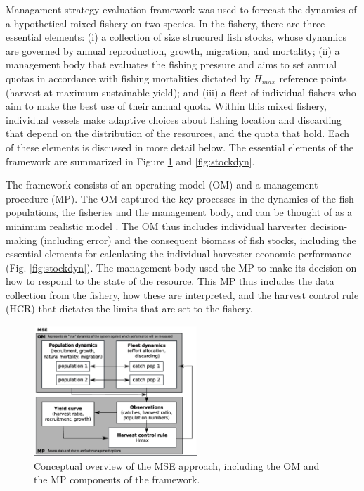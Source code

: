 \documentclass[12pt,oneline,a4paper,numbib]{ouparticle}
\numberwithin{equation}{subsection} %
\begin{document}
Managament strategy evaluation framework was used to forecast the dynamics of a hypothetical mixed fishery on two species. In the fishery, there are three essential elements: (i) a collection of size strucured fish stocks, whose dynamics are governed by annual reproduction, growth, migration, and mortality; (ii) a management body that evaluates the fishing pressure and aims to set annual quotas in accordance with fishing mortalities dictated by $H_{max}$ reference points (harvest at maximum sustainable yield); and (iii) a fleet of individual fishers who aim to make the best use of their annual quota. Within this mixed fishery, individual vessels make adaptive choices about fishing location and discarding that depend on the distribution of the resources, and the quota that hold. Each of these elements is discussed in more detail below. The essential elements of the framework are summarized in Figure \ref{fig:MSE} and \ref{fig:stockdyn}.

The framework consists of an operating model (OM) and a management procedure (MP). The OM captured the key processes in the dynamics of the fish populations, the fisheries and the management body, and can be thought of as a minimum realistic model \cite{Punt1995}.  The OM thus includes individual harvester decision-making (including error) and the consequent biomass of fish stocks, including the essential elements for calculating the individual harvester economic performance (Fig. \ref{fig:stockdyn}). The management body used the MP to make its decision on how to respond to the state of the resource. This MP thus includes the data collection from the fishery, how these are interpreted, and the harvest control rule (HCR) that dictates the limits that are set to the fishery. 

 
\begin{figure}[!h]
\centering
\includegraphics[width=0.55\textwidth]{Figures/MSE.eps} 
\caption{Conceptual overview of the MSE approach, including the OM and the MP components of the framework.}
\label{fig:MSE}
\end{figure}
\end{document}
